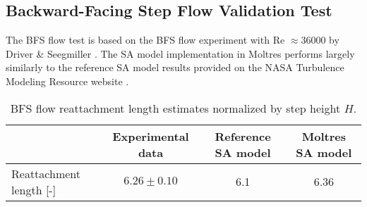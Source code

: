 \subsection{Backward-Facing Step Flow Validation Test}

The \gls{BFS} flow test is based on the BFS flow experiment with Re $\approx36000$ by Driver \&
Seegmiller \cite{driver_features_1985}. The \gls{SA} model implementation in Moltres performs
largely similarly to the reference SA model results
provided on the \gls{NASA} Turbulence Modeling Resource website \cite{rumsey_turbulence_nodate}.

\begin{table}[htb]
  \centering
  \small
  \caption{\gls{BFS} flow reattachment length estimates normalized by step height $H$.}
  \begin{tabular}{l c c c}
    \toprule
    & {Experimental data \cite{driver_features_1985}} & {Reference \gls{SA} model
  \cite{rumsey_turbulence_nodate}} & {Moltres \gls{SA} model} \\
    \midrule
    Reattachment length [-] & {$6.26 \pm 0.10$} & 6.1 & 6.36 \\
    \bottomrule
  \end{tabular}
  \label{table:bfs}
\end{table}


